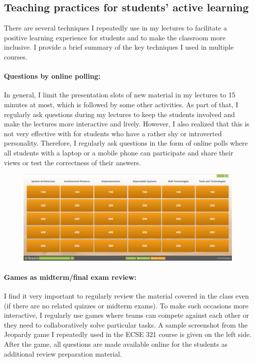 \subsection{Teaching practices for students' active learning}

There are several techniques I repeatedly use in my lectures to facilitate a positive learning experience for students and 
to make the classroom more inclusive. I provide a brief summary of the key techniques I used in multiple courses. 


\paragraph{Questions by online polling:}
In general, I limit the presentation slots of new material in my lectures to 15 minutes at most, which is followed by some 
other activities. As part of that, I regularly ask questions during my lectures to keep the students involved and make the 
lectures more interactive and lively. However, I also realized that this is not very effective with for students who have a 
rather shy or introverted personality. Therefore, I regularly ask questions in the form of online polls where all students with 
a laptop or a mobile phone can participate and share their views or test the correctness of their answers. 

\begin{figure}
  \begin{center}
\includegraphics[width=.5\textwidth]{figures/FlipQuiz}
  \end{center}
\end{figure}

\paragraph{Games as midterm/final exam review:}
I find it very important to regularly review the material covered in the class even (if there are no related quizzes or midterm exams). To make such occasions more interactive, I regularly use games where teams can compete against each other or they need to collaboratively solve particular tasks. A sample screenshot from the Jeopardy game I repeatedly used in the ECSE 321 course is given on the left side. After the game, all questions are made available online for the students as additional review preparation material.

